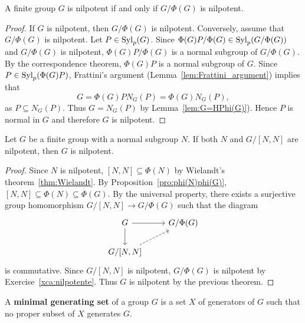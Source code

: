 \begin{theorem}
\label{the:G/phi(G)}
A finite group $G$ is nilpotent if and only if 
$G/\Phi(G)$ is nilpotent. 
\end{theorem}

\begin{proof}
If $G$ is nilpotent, then $G/\Phi(G)$ is nilpotent. Conversely, assume that 
$G/\Phi(G)$ is nilpotent. Let $P\in\mathrm{Syl}_p(G)$. Since 
$\Phi(G)P/\Phi(G)\in\mathrm{Syl}_p(G/\Phi(G))$ and $G/\Phi(G)$ is nilpotent,
$\Phi(G)P/\Phi(G)$ is a normal subgroup of $G/\Phi(G)$. By the correspondence theorem, 
$\Phi(G)P$ is a normal subgroup of $G$.
Since $P\in\mathrm{Syl}_p(\Phi(G)P)$, Frattini's argument 
(Lemma~\ref{lem:Frattini_argument}) implies that 
\[
G=\Phi(G)PN_G(P)=\Phi(G)N_G(P), 
\]
as $P\subseteq N_G(P)$. Thus $G=N_G(P)$ by Lemma~\ref{lem:G=HPhi(G)}). Hence 
$P$ is normal in $G$ and therefore $G$ is nilpotent. 
\end{proof}

\begin{theorem}[Hall]
\label{thm:Hall_nilpotente}
Let $G$ be a finite group with a normal subgroup $N$. If both $N$ and 
$G/[N,N]$ are nilpotent, then $G$ is nilpotent.
\end{theorem}

\begin{proof}
Since $N$ is nilpotent, $[N,N]\subseteq\Phi(N)$ by 
Wielandt's theorem~\ref{thm:Wielandt}. 
By Proposition~\ref{pro:phi(N)phi(G)},
$[N,N]\subseteq\Phi(N)\subseteq\Phi(G)$. 
By the universal property, there exists a surjective group homomorphism 
$G/[N,N]\to G/\Phi(G)$ such that the diagram 
    \[
    \begin{tikzcd}
	G & {G/\Phi(G)} \\
	{G/[N,N]}
	\arrow[from=1-1, to=1-2]
	\arrow[from=1-1, to=2-1]
	\arrow[dashed, from=2-1, to=1-2]
    \end{tikzcd}
    \]
is commutative. Since $G/[N,N]$ is nilpotent, $G/\Phi(G)$ is nilpotent by 
Exercise~\ref{xca:nilpotente}. Thus $G$ is nilpotent by the previous theorem. 
\end{proof}

\begin{definition}
A \textbf{minimal generating set} of a group $G$ is a set 
$X$ of generators of $G$ such that no proper subset of $X$ generates $G$. 
\end{definition}


